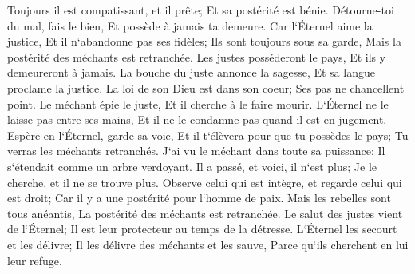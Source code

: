 \verse Toujours il est compatissant, et il prête; Et sa postérité est bénie. 
\verse Détourne-toi du mal, fais le bien, Et possède à jamais ta demeure. 
\verse Car l`Éternel aime la justice, Et il n`abandonne pas ses fidèles; Ils sont toujours sous sa garde, Mais la postérité des méchants est retranchée. 
\verse Les justes posséderont le pays, Et ils y demeureront à jamais. 
\verse La bouche du juste annonce la sagesse, Et sa langue proclame la justice. 
\verse La loi de son Dieu est dans son coeur; Ses pas ne chancellent point. 
\verse Le méchant épie le juste, Et il cherche à le faire mourir. 
\verse L`Éternel ne le laisse pas entre ses mains, Et il ne le condamne pas quand il est en jugement. 
\verse Espère en l`Éternel, garde sa voie, Et il t`élèvera pour que tu possèdes le pays; Tu verras les méchants retranchés. 
\verse J`ai vu le méchant dans toute sa puissance; Il s`étendait comme un arbre verdoyant. 
\verse Il a passé, et voici, il n`est plus; Je le cherche, et il ne se trouve plus. 
\verse Observe celui qui est intègre, et regarde celui qui est droit; Car il y a une postérité pour l`homme de paix. 
\verse Mais les rebelles sont tous anéantis, La postérité des méchants est retranchée. 
\verse Le salut des justes vient de l`Éternel; Il est leur protecteur au temps de la détresse. 
\verse L`Éternel les secourt et les délivre; Il les délivre des méchants et les sauve, Parce qu`ils cherchent en lui leur refuge. 

